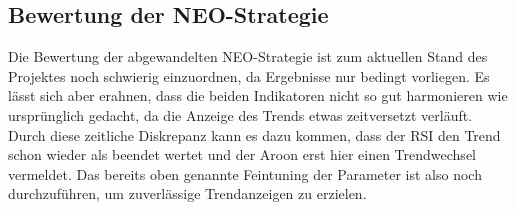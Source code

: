 \subsection{Bewertung der NEO-Strategie}
Die Bewertung der abgewandelten NEO-Strategie ist zum aktuellen Stand des Projektes noch schwierig einzuordnen, da Ergebnisse nur bedingt vorliegen. Es lässt sich aber erahnen, dass die beiden Indikatoren nicht so gut harmonieren wie ursprünglich gedacht, da die Anzeige des Trends etwas zeitversetzt verläuft. Durch diese zeitliche Diskrepanz kann es dazu kommen, dass der RSI den Trend schon wieder als beendet wertet und der Aroon erst hier einen Trendwechsel vermeldet. Das bereits oben genannte Feintuning der Parameter ist also noch durchzuführen, um zuverlässige Trendanzeigen zu erzielen.

%



